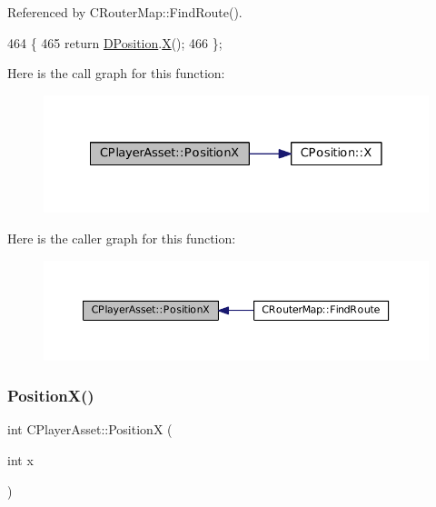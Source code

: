 Referenced by C\+Router\+Map\+::\+Find\+Route().


\begin{DoxyCode}
464                              \{
465             \textcolor{keywordflow}{return} \hyperlink{classCPlayerAsset_aa9f53c009b181c7c5647c6b03776a04c}{DPosition}.\hyperlink{classCPosition_a9a6b94d3b91df1492d166d9964c865fc}{X}();  
466         \};
\end{DoxyCode}
Here is the call graph for this function\+:\nopagebreak
\begin{figure}[H]
\begin{center}
\leavevmode
\includegraphics[width=328pt]{classCPlayerAsset_a9cf8961ac97f2928d1e08bc4f311f220_cgraph}
\end{center}
\end{figure}
Here is the caller graph for this function\+:\nopagebreak
\begin{figure}[H]
\begin{center}
\leavevmode
\includegraphics[width=350pt]{classCPlayerAsset_a9cf8961ac97f2928d1e08bc4f311f220_icgraph}
\end{center}
\end{figure}
\hypertarget{classCPlayerAsset_a3b0981638b2e86e1ffb211365db26b41}{}\label{classCPlayerAsset_a3b0981638b2e86e1ffb211365db26b41} 
\subsubsection{\texorpdfstring{Position\+X()}{PositionX()}\hspace{0.1cm}{\footnotesize\ttfamily [2/2]}}
{\footnotesize\ttfamily int C\+Player\+Asset\+::\+PositionX (\begin{DoxyParamCaption}\item[{int}]{x }\end{DoxyParamCaption})}



